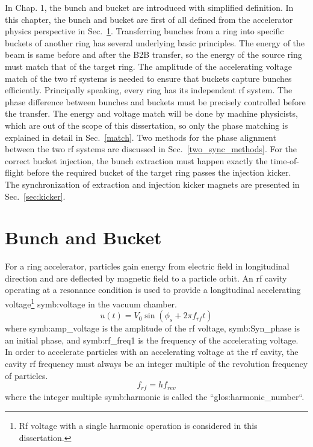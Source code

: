 In Chap. 1, the bunch and bucket are introduced with simplified definition. In this chapter, the bunch and bucket are first of all defined from the accelerator physics perspective in Sec.~\ref{bunch and bucket}. Transferring bunches from a ring into specific buckets of another ring has several underlying basic principles. The energy of the beam is same before and after the B2B transfer, so the energy of the source ring must match that of the target ring. The amplitude of the accelerating voltage match of the two rf systems is needed to ensure that buckets capture bunches efficiently. Principally speaking, every ring has its independent rf system. The phase difference between bunches and buckets must be precisely controlled before the transfer. The energy and voltage match will be done by machine physicists, which are out of the scope of this dissertation, so only the phase matching is explained in detail in Sec.~\ref{match}. Two methods for the phase alignment between the two rf systems are discussed in Sec.~\ref{two_sync_methods}. For the correct bucket injection, the bunch extraction must happen exactly the time-of-flight before the required bucket of the target ring passes the injection kicker. The synchronization of extraction and injection kicker magnets are presented in Sec.~\ref{sec:kicker}.

\section{Bunch and Bucket}
\label{bunch and bucket}
For a ring accelerator, particles gain energy from electric field in longitudinal direction and are deflected by magnetic field to a particle orbit. An rf cavity operating at a resonance condition is used to provide a longitudinal accelerating voltage\footnote{Rf voltage with a single harmonic operation is considered in this dissertation.} \gls{symb:voltage} in the vacuum chamber.
\begin{equation}
u(t)=V_0\sin(\phi_\mathit{s}+2\pi f_\mathit{rf}t)
\end{equation}
where \gls{symb:amp_voltage} is the amplitude of the rf voltage, \gls{symb:Syn_phase} is an initial phase, and \gls{symb:rf_freq1} is the frequency of the accelerating voltage. In order to accelerate particles with an accelerating voltage at the rf cavity, the cavity rf frequency must always be an integer multiple of the revolution frequency of particles. 
\begin{equation}
	f_{\mathit{rf}}=hf_{\mathit{rev}}\label{harmonic_number}
\end{equation}
where the integer multiple \gls{symb:harmonic} is called the ``\gls{glos:harmonic_number}``. 

